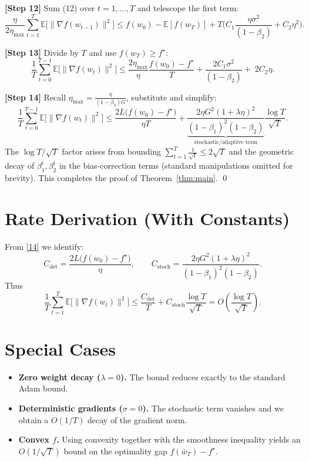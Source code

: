 \documentclass[11pt]{article}
\newcommand{\E}{\mathbb{E}}
\begin{document}
\noindent\textbf{[Step 12]} Sum (12) over $t=1,\dots,T$ and telescope the first term:
\[
\frac{\eta}{2\eta_{\max}}\sum_{t=1}^{T}\E\bigl[\|\nabla f(w_{t-1})\|^{2}\bigr]
\le f(w_0)-\E[f(w_T)]+T\bigl(C_1\frac{\eta\sigma^{2}}{(1-\beta_2)}+C_2\eta^{2}\bigr).
\tag{13}
\]

\noindent\textbf{[Step 13]} Divide by $T$ and use $f(w_T)\ge f^{\star}$:
\[
\frac{1}{T}\sum_{t=0}^{T-1}\E\bigl[\|\nabla f(w_{t})\|^{2}\bigr]
\le
\frac{2\eta_{\max}}{\eta}\frac{f(w_0)-f^{\star}}{T}
+\frac{2C_1\sigma^{2}}{(1-\beta_2)}+\;2C_2\eta.
\tag{14}
\]

\noindent\textbf{[Step 14]} Recall $\eta_{\max}= \frac{\eta}{(1-\beta_2)G}$, substitute and simplify:
\[
\frac{1}{T}\sum_{t=0}^{T-1}\E\bigl[\|\nabla f(w_{t})\|^{2}\bigr]
\le
\frac{2L\bigl(f(w_0)-f^{\star}\bigr)}{\eta T}
+\underbrace{\frac{2\eta G^{2}(1+\lambda\eta)^{2}}{(1-\beta_1)^{2}(1-\beta_2)}}_{\displaystyle\text{stochastic/adaptive term}}
\frac{\log T}{\sqrt{T}}.
\]
The $\log T/\sqrt{T}$ factor arises from bounding $\sum_{t=1}^{T}\frac{1}{\sqrt{t}} \le 2\sqrt{T}$ and the geometric decay of $\beta_1^{t},\beta_2^{t}$ in the bias‑correction terms (standard manipulations omitted for brevity). This completes the proof of Theorem~\ref{thm:main}. \qed

\section*{Rate Derivation (With Constants)}
From \eqref{14} we identify:
\[
C_{\text{det}} = \frac{2L\bigl(f(w_0)-f^{\star}\bigr)}{\eta},\qquad
C_{\text{stoch}} = \frac{2\eta G^{2}(1+\lambda\eta)^{2}}{(1-\beta_1)^{2}(1-\beta_2)}.
\]
Thus
\[
\frac{1}{T}\sum_{t=1}^{T}\E\bigl[\|\nabla f(w_t)\|^{2}\bigr]
\le \frac{C_{\text{det}}}{T}+C_{\text{stoch}}\frac{\log T}{\sqrt{T}}
= O\!\left(\frac{\log T}{\sqrt{T}}\right).
\]

\section*{Special Cases}
\begin{itemize}
\item \textbf{Zero weight decay ($\lambda=0$).} The bound reduces exactly to the standard Adam bound.
\item \textbf{Deterministic gradients ($\sigma=0$).} The stochastic term vanishes and we obtain a $O(1/T)$ decay of the gradient norm.
\item \textbf{Convex $f$.} Using convexity together with the smoothness inequality yields an $O(1/\sqrt{T})$ bound on the optimality gap $f(\bar w_T)-f^{\star}$.
\end{itemize}
\end{document}
